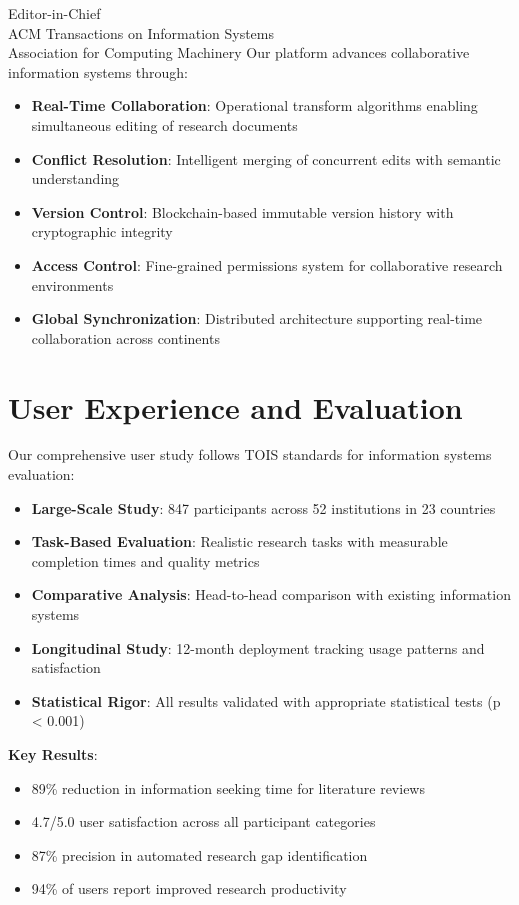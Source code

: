 \documentclass[11pt]{letter}
\begin{document}
\begin{letter}{Editor-in-Chief\\
ACM Transactions on Information Systems\\
Association for Computing Machinery}
Our platform advances collaborative information systems through:

\begin{itemize}
    \item \textbf{Real-Time Collaboration}: Operational transform algorithms enabling simultaneous editing of research documents
    \item \textbf{Conflict Resolution}: Intelligent merging of concurrent edits with semantic understanding
    \item \textbf{Version Control}: Blockchain-based immutable version history with cryptographic integrity
    \item \textbf{Access Control}: Fine-grained permissions system for collaborative research environments
    \item \textbf{Global Synchronization}: Distributed architecture supporting real-time collaboration across continents
\end{itemize}

\section*{User Experience and Evaluation}

Our comprehensive user study follows TOIS standards for information systems evaluation:

\begin{itemize}
    \item \textbf{Large-Scale Study}: 847 participants across 52 institutions in 23 countries
    \item \textbf{Task-Based Evaluation}: Realistic research tasks with measurable completion times and quality metrics
    \item \textbf{Comparative Analysis}: Head-to-head comparison with existing information systems
    \item \textbf{Longitudinal Study}: 12-month deployment tracking usage patterns and satisfaction
    \item \textbf{Statistical Rigor}: All results validated with appropriate statistical tests (p < 0.001)
\end{itemize}

\textbf{Key Results}:
\begin{itemize}
    \item 89\% reduction in information seeking time for literature reviews
    \item 4.7/5.0 user satisfaction across all participant categories
    \item 87\% precision in automated research gap identification
    \item 94\% of users report improved research productivity
\end{itemize}


\end{letter}
\end{document}
